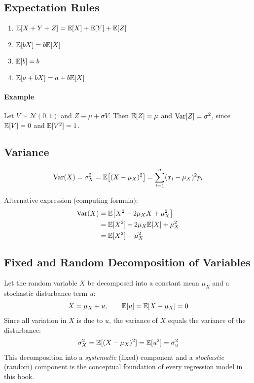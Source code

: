 \subsection{Expectation Rules}

\begin{enumerate}
  \item $\mathbb{E}[X + Y + Z] = \mathbb{E}[X] + \mathbb{E}[Y] + \mathbb{E}[Z]$
  \item $\mathbb{E}[bX] = b\mathbb{E}[X]$
  \item $\mathbb{E}[b] = b$
  \item $\mathbb{E}[a + bX] = a + b\mathbb{E}[X]$
\end{enumerate}

\paragraph{Example} Let $V \sim \mathcal{N}(0,1)$ and $Z \equiv \mu + \sigma V$.
Then $\mathbb{E}[Z] = \mu$ and $\operatorname{Var}[Z] = \sigma^2$, since $\mathbb{E}[V]=0$ and
$\mathbb{E}[V^2]=1$.

\subsection{Variance}

\begin{equation}
  \operatorname{Var}(X) = \sigma^2_X = \mathbb{E}\bigl[(X-\mu_X)^2\bigr]
  = \sum_{i=1}^{n}(x_i - \mu_X)^2 p_i
\end{equation}

Alternative expression (computing formula):
\begin{align}
  \operatorname{Var}(X) &= \mathbb{E}\bigl[X^2 - 2\mu_X X + \mu_X^2\bigr] \nonumber \\
          &= \mathbb{E}[X^2] - 2\mu_X \mathbb{E}[X] + \mu_X^2 \nonumber \\
          &= \mathbb{E}[X^2] - \mu_X^2
\end{align}

\subsection{Fixed and Random Decomposition of Variables}

Let the random variable $X$ be decomposed into a constant mean $\mu_X$ and a
stochastic disturbance term $u$:
\begin{equation}
  X = \mu_X + u, \qquad \mathbb{E}[u] = \mathbb{E}[X - \mu_X] = 0
\end{equation}
Since all variation in $X$ is due to $u$, the variance of $X$ equals the
variance of the disturbance:
\begin{equation}
  \sigma^2_X = \mathbb{E}[(X-\mu_X)^2] = \mathbb{E}[u^2] = \sigma^2_u
\end{equation}
This decomposition into a \emph{systematic} (fixed) component and a
\emph{stochastic} (random) component is the conceptual foundation of every
regression model in this book.


